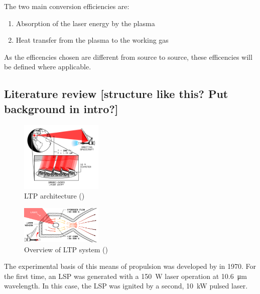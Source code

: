         The two main conversion efficiencies are:
        \begin{enumerate}
            \item Absorption of the laser energy by the plasma
            \item Heat transfer from the plasma to the working gas
        \end{enumerate}

    As the efficencies chosen are different from source to source, these efficencies will be defined where applicable.

    \subsection{Literature review [structure like this? Put background in intro?]}
    \begin{figure}[h]
        \centering
        \includegraphics[width=0.35\textwidth]{assets/2 background/ltp_architecture.pdf}
        \caption{LTP architecture (\textcite{duplayArgonLaserPlasmaThruster2024a})}
        \label{fig:LTP architecture}
    \end{figure}

    \begin{figure}[h]
        \centering
        \includegraphics[width=0.35\textwidth]{assets/2 background/chamber.pdf}
        \caption{Overview of LTP system (\textcite{duplayArgonLaserPlasmaThruster2024a})}
        \label{fig:Keefer apparatus}
    \end{figure}
    

    The experimental basis of this means of propulsion was developed by \textcite{generalovContinuousOpticalDischarge1970} in 1970. For the first time, an LSP was generated with a \qty{150}{W}  laser operation at \qty{10.6}{μm} wavelength. In this case, the LSP was ignited by a second, \qty{10}{kW} pulsed  laser.
    
